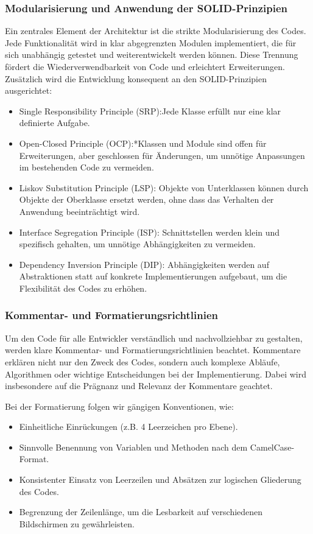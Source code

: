 \subsubsection{Modularisierung und Anwendung der SOLID-Prinzipien}
Ein zentrales Element der Architektur ist die strikte Modularisierung des Codes. Jede Funktionalität wird in klar abgegrenzten Modulen implementiert, die für sich unabhängig getestet und weiterentwickelt werden können. Diese Trennung fördert die Wiederverwendbarkeit von Code und erleichtert Erweiterungen. Zusätzlich wird die Entwicklung konsequent an den SOLID-Prinzipien ausgerichtet:
\begin{itemize}
    \item Single Responsibility Principle (SRP):Jede Klasse erfüllt nur eine klar definierte Aufgabe.
    \item Open-Closed Principle (OCP):*Klassen und Module sind offen für Erweiterungen, aber geschlossen für Änderungen, um unnötige Anpassungen im bestehenden Code zu vermeiden.
    \item Liskov Substitution Principle (LSP): Objekte von Unterklassen können durch Objekte der Oberklasse ersetzt werden, ohne dass das Verhalten der Anwendung beeinträchtigt wird.
    \item Interface Segregation Principle (ISP): Schnittstellen werden klein und spezifisch gehalten, um unnötige Abhängigkeiten zu vermeiden.
    \item Dependency Inversion Principle (DIP): Abhängigkeiten werden auf Abstraktionen statt auf konkrete Implementierungen aufgebaut, um die Flexibilität des Codes zu erhöhen.
\end{itemize}

\subsubsection{Kommentar- und Formatierungsrichtlinien}
Um den Code für alle Entwickler verständlich und nachvollziehbar zu gestalten, werden klare Kommentar- und Formatierungsrichtlinien beachtet. Kommentare erklären nicht nur den Zweck des Codes, sondern auch komplexe Abläufe, Algorithmen oder wichtige Entscheidungen bei der Implementierung. Dabei wird insbesondere auf die Prägnanz und Relevanz der Kommentare geachtet.

Bei der Formatierung folgen wir gängigen Konventionen, wie:
\begin{itemize}
    \item Einheitliche Einrückungen (z.B. 4 Leerzeichen pro Ebene).
    \item Sinnvolle Benennung von Variablen und Methoden nach dem CamelCase-Format.
    \item Konsistenter Einsatz von Leerzeilen und Absätzen zur logischen Gliederung des Codes.
    \item Begrenzung der Zeilenlänge, um die Lesbarkeit auf verschiedenen Bildschirmen zu gewährleisten.
\end{itemize}

